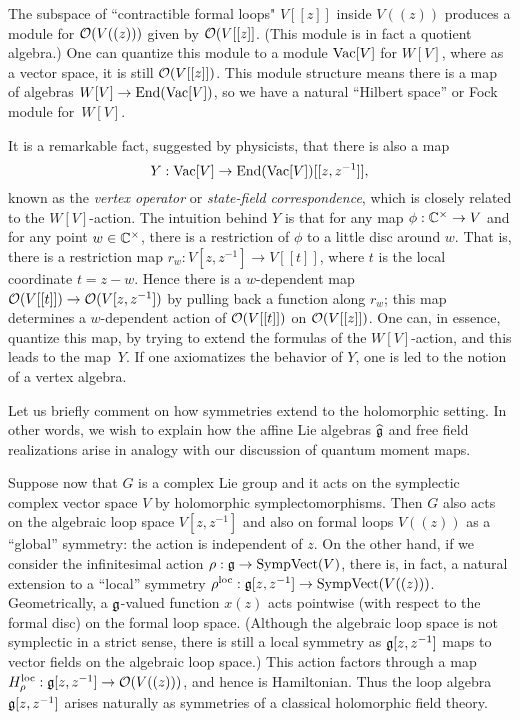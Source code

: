 \documentclass[11pt]{amsart}
\begin{document}
The subspace of ``contractible formal loops" $V[[z]]$ inside $V((z))$ produces a module for $\mathcal O(V((z)))$ given by $\mathcal O(V[[z]]$. 
(This module is in fact a quotient algebra.)
One can quantize this module to a module ${\rm Vac}[V]$ for $W[V]$,
where as a vector space, it is still $\mathcal O(V[[z]])$.
This module structure means there is a map of algebras $W[V] \to {\rm End}({\rm Vac}[V])$,
so we have a natural ``Hilbert space'' or Fock module for~$W[V]$.

It is a remarkable fact, suggested by physicists, that there is also a map
\[
Y: {\rm Vac}[V] \to {\rm End}({\rm Vac}[V])[[z, z^{-1}]],
\]
known as the {\em vertex operator} or {\em state-field correspondence},
which is closely related to the $W[V]$-action.
The intuition behind $Y$ is that for any map $\phi: \mathbb C^\times \to V$ and for any point $w \in \mathbb C^\times$, 
there is a restriction of $\phi$ to a little disc around $w$.
That is, there is a restriction map $r_w: V[z,z^{-1}] \to V[[t]]$, where $t$ is the local coordinate $t = z-w$.
Hence there is a $w$-dependent map $\mathcal O(V[[t]]) \to \mathcal O(V[z,z^{-1}])$ by pulling back a function along $r_w$;
this map determines a $w$-dependent action of $\mathcal O(V[[t]])$ on $\mathcal O(V[[z]])$.
One can, in essence, quantize this map, by trying to extend the formulas of the $W[V]$-action,
and this leads to the map~$Y$.
If one axiomatizes the behavior of $Y$, one is led to the notion of a vertex algebra.

Let us briefly comment on how symmetries extend to the holomorphic setting.
In other words, we wish to explain how the affine Lie algebras $\widehat{\mathfrak g}$ and free field realizations arise in analogy with our discussion of quantum moment maps.

Suppose now that $G$ is a complex Lie group and it acts on the symplectic complex vector space $V$ by holomorphic symplectomorphisms.
Then $G$ also acts on the algebraic loop space $V[z,z^{-1}]$ and also on formal loops $V((z))$ as a ``global'' symmetry:
the action is independent of $z$.
On the other hand, if we consider the infinitesimal action $\rho: \mathfrak g \to {\rm SympVect}(V)$,
there is, in fact, a natural extension to a ``local'' symmetry $\rho^{\rm loc}: \mathfrak g[z,z^{-1}] \to {\rm SympVect}(V((z)))$.
Geometrically, a $\mathfrak g$-valued function $x(z)$ acts pointwise (with respect to the formal disc) on the formal loop space.
(Although the algebraic loop space is not symplectic in a strict sense,
there is still a local symmetry as $\mathfrak g[z,z^{-1}]$ maps to vector fields on the algebraic loop space.)
This action factors through a map $H_\rho^{\rm loc}: \mathfrak g[z,z^{-1}] \to \mathcal O(V((z)))$,
and hence is Hamiltonian.
Thus the loop algebra $\mathfrak g[z,z^{-1}]$ arises naturally as symmetries of a classical holomorphic field theory.
\end{document}
